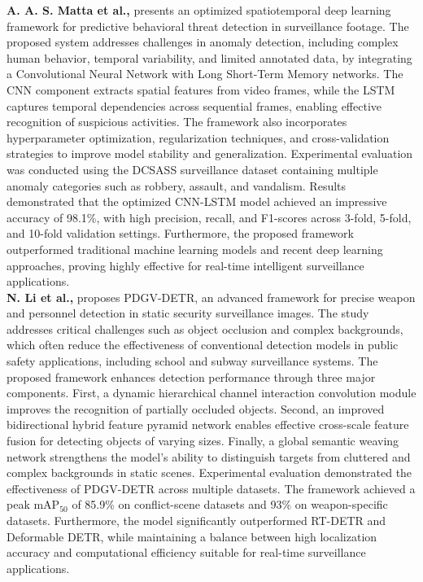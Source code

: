 \textbf{A. A. S. Matta et al.,} presents an optimized spatiotemporal deep learning framework for predictive behavioral threat detection in surveillance footage. The proposed system addresses challenges in anomaly detection, including complex human behavior, temporal variability, and limited annotated data, by integrating a Convolutional Neural Network with Long Short-Term Memory networks. The CNN component extracts spatial features from video frames, while the LSTM captures temporal dependencies across sequential frames, enabling effective recognition of suspicious activities. The framework also incorporates hyperparameter optimization, regularization techniques, and cross-validation strategies to improve model stability and generalization. Experimental evaluation was conducted using the DCSASS surveillance dataset containing multiple anomaly categories such as robbery, assault, and vandalism. Results demonstrated that the optimized CNN-LSTM model achieved an impressive accuracy of 98.1\%, with high precision, recall, and F1-scores across 3-fold, 5-fold, and 10-fold validation settings. Furthermore, the proposed framework outperformed traditional machine learning models and recent deep learning approaches, proving highly effective for real-time intelligent surveillance applications. \textbf{\cite{supplementary_paper_2}} \\

\textbf{N. Li et al.,} proposes PDGV-DETR, an advanced framework for precise weapon and personnel detection in static security surveillance images. The study addresses critical challenges such as object occlusion and complex backgrounds, which often reduce the effectiveness of conventional detection models in public safety applications, including school and subway surveillance systems. The proposed framework enhances detection performance through three major components. First, a dynamic hierarchical channel interaction convolution module improves the recognition of partially occluded objects. Second, an improved bidirectional hybrid feature pyramid network enables effective cross-scale feature fusion for detecting objects of varying sizes. Finally, a global semantic weaving network strengthens the model’s ability to distinguish targets from cluttered and complex backgrounds in static scenes. Experimental evaluation demonstrated the effectiveness of PDGV-DETR across multiple datasets. The framework achieved a peak mAP$_{50}$ of 85.9\% on conflict-scene datasets and 93\% on weapon-specific datasets. Furthermore, the model significantly outperformed RT-DETR and Deformable DETR, while maintaining a balance between high localization accuracy and computational efficiency suitable for real-time surveillance applications. \textbf{\cite{supplementary_paper_3}} \\


